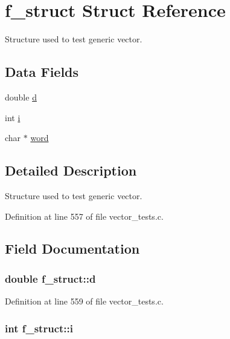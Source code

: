 \hypertarget{structf__struct}{\section{f\-\_\-struct \-Struct \-Reference}
\label{structf__struct}
}


\-Structure used to test generic vector.  


\subsection*{\-Data \-Fields}
\begin{DoxyCompactItemize}
\item 
double \hyperlink{structf__struct_aabfd173ef817f4c258a9e55aaa2ec9cf}{d}
\item 
int \hyperlink{structf__struct_a87df300d9aa87b7df7cba13e548c948f}{i}
\item 
char $\ast$ \hyperlink{structf__struct_aa8f65f08c5e6180da916f9001438eab5}{word}
\end{DoxyCompactItemize}


\subsection{\-Detailed \-Description}
\-Structure used to test generic vector. 



\-Definition at line 557 of file vector\-\_\-tests.\-c.



\subsection{\-Field \-Documentation}
\hypertarget{structf__struct_aabfd173ef817f4c258a9e55aaa2ec9cf}{
\subsubsection[{d}]{\setlength{\rightskip}{0pt plus 5cm}double {\bf f\-\_\-struct\-::d}}}\label{structf__struct_aabfd173ef817f4c258a9e55aaa2ec9cf}


\-Definition at line 559 of file vector\-\_\-tests.\-c.

\hypertarget{structf__struct_a87df300d9aa87b7df7cba13e548c948f}{
\subsubsection[{i}]{\setlength{\rightskip}{0pt plus 5cm}int {\bf f\-\_\-struct\-::i}}}\label{structf__struct_a87df300d9aa87b7df7cba13e548c948f}


